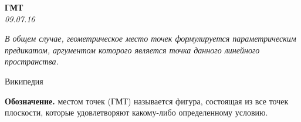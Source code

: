 \renewcommand{\baselinestretch}{0.8}
\parskip

\begin{center}
\textbf{\Large ГМТ}\\
\textit{09.07.16}
\end{center}

\epigraph{\it В общем случае, геометрическое место точек формулируется параметрическим предикатом, аргументом которого является точка данного линейного пространства.}{Википедия}

\textbf{Обозначение.} { местом точек (ГМТ)} называется фигура, состоящая из все точек плоскости, которые удовлетворяют какому-либо определенному условию.




